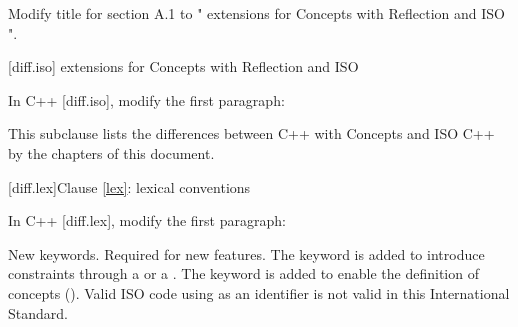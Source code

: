 \setcounter{chapter}{0}

Modify title for section A.1 to "\Cpp{} extensions for Concepts with Reflection
and ISO \CppXIV{}".

\setcounter{section}{0}
[diff.iso]{\Cpp{} extensions for Concepts with Reflection and ISO \CppXIV{}}

In C++ [diff.iso], modify the first paragraph:

\begin{std.txt}
This subclause lists the differences between C++ with  Concepts and ISO C++ by the chapters of this document.
\end{std.txt}

[diff.lex]{Clause \ref{lex}: lexical conventions}

In C++ [diff.lex], modify the first paragraph:

\begin{std.txt}
\change New keywords.
\rationale Required for new features.
The  keyword is added
to introduce constraints through a  or
a . The  keyword is
added to enable the definition of concepts ().
\effect
Valid ISO \CppXVII{} code using \added{,} 
as an identifier is not valid in this International Standard.
\end{std.txt}
